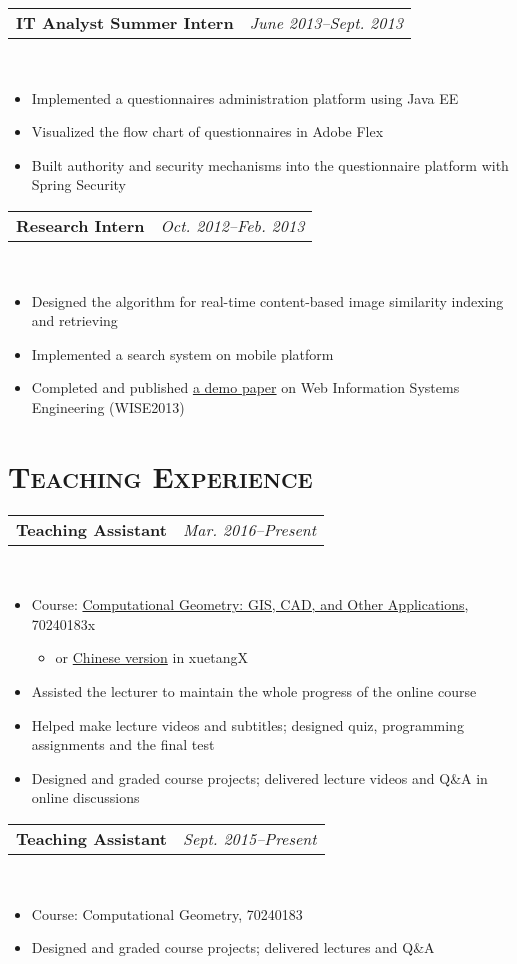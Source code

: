 \documentclass[11pt,a4paper,roman]{moderncv}        %
\makeatletter
\newcommand{\cvexpr}[5][1em]{
  \begin{tabular*}{\maincolumnwidth}{l@{\extracolsep{\fill}}r}%
    {\textbf{#3}\ifthenelse{\equal{#4}{}}{}{, #4}} & {\small\itshape#2}%
  \end{tabular*}%
  \\
  \begin{minipage}{\maincolumnwidth}%
        #5%
  \end{minipage}%
  \par\addvspace{#1}
}
\makeatother
\begin{document}
\cvexpr{June 2013--Sept. 2013}{IT Analyst Summer Intern}{Morgan Stanley}{
\begin{itemize}
\item Implemented a questionnaires administration platform using Java EE
\item Visualized the flow chart of questionnaires in Adobe Flex
\item Built authority and security mechanisms into the questionnaire platform with Spring Security
\end{itemize}
}

\cvexpr{Oct. 2012--Feb. 2013}{Research Intern}{School of ITEE, University of Queensland}{
\begin{itemize}
\item Designed the algorithm for real-time content-based image similarity indexing and retrieving
\item Implemented a search system on mobile platform
\item Completed and published \href{http://link.springer.com/chapter/10.1007\%2F978-3-642-41154-0_47}{a demo paper} on Web Information Systems Engineering (WISE2013)
\end{itemize}
}

\section{\scshape Teaching Experience}
\cvexpr{Mar. 2016--Present}{Teaching Assistant}{TsinghuaX, edX}{
\begin{itemize}
\item Course: \href{https://www.edx.org/course/computational-geometry-gis-cad-other-tsinghuax-70240183x-0}{Computational Geometry: GIS, CAD, and Other Applications}, 70240183x\begin{itemize}
\item or \href{http://www.xuetangx.com/courses/course-v1:TsinghuaX+70240183x+2016_2/about}{Chinese version} in xuetangX
\end{itemize}
\item Assisted the lecturer to maintain the whole progress of the online course
\item Helped make lecture videos and subtitles; designed quiz, programming assignments and the final test
\item Designed and graded course projects; delivered lecture videos and Q\&A in online discussions
\end{itemize}
}

\cvexpr{Sept. 2015--Present}{Teaching Assistant}{Tsinghua University}{
\begin{itemize}
\item Course: Computational Geometry, 70240183
\item Designed and graded course projects; delivered lectures and Q\&A
\end{itemize}
}
\end{document}
